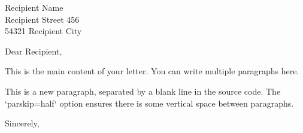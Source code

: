 \documentclass[
    version=last,      %
    paper=a4,          %
    fontsize=11pt,     %
    english,           %
    fromalign=right,   %
    parskip=half       %
]{scrlttr2}
\begin{document}
\begin{letter}{
    Recipient Name \\
    Recipient Street 456 \\
    54321 Recipient City
}

\opening{Dear Recipient,}

This is the main content of your letter. You can write multiple paragraphs here.

This is a new paragraph, separated by a blank line in the source code. The `parskip=half` option ensures there is some vertical space between paragraphs.

\closing{Sincerely,}


\end{letter}
\end{document}
